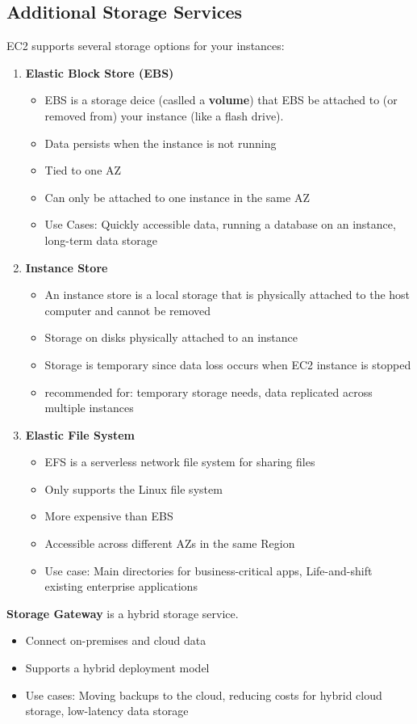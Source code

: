 \documentclass{article}%
\begin{document}
\subsection{Additional Storage Services}
EC2 supports several storage options for your instances:
\begin{enumerate}
    \item \textbf{Elastic Block Store (EBS)}
    \begin{itemize}
        \item EBS is a storage deice (caslled a \textbf{volume}) that EBS be attached to (or removed from) your instance (like a flash drive).
        \item Data persists when the instance is not running
        \item Tied to one AZ
        \item Can only be attached to one instance in the same AZ
        \item Use Cases: Quickly accessible data, running a database on an instance, long-term data storage
    \end{itemize}
    \item \textbf{Instance Store}
    \begin{itemize}
        \item An instance store is a local storage that is physically attached to the host computer and cannot be removed
        \item Storage on disks physically attached to an instance
        \item Storage is temporary since data loss occurs when EC2 instance is stopped
        \item recommended for: temporary storage needs, data replicated across multiple instances
    \end{itemize}
    \item \textbf{Elastic File System}
    \begin{itemize}
        \item EFS is a serverless network file system for sharing files
        \item Only supports the Linux file system
        \item More expensive than EBS
        \item Accessible across different AZs in the same Region
        \item Use case: Main directories for business-critical apps, Life-and-shift existing enterprise applications
    \end{itemize}
\end{enumerate}
\textbf{Storage Gateway} is a hybrid storage service.
\begin{itemize}
    \item Connect on-premises and cloud data
    \item Supports a hybrid deployment model
    \item Use cases: Moving backups to the cloud, reducing costs for hybrid cloud storage, low-latency data storage
\end{itemize}
\end{document}

